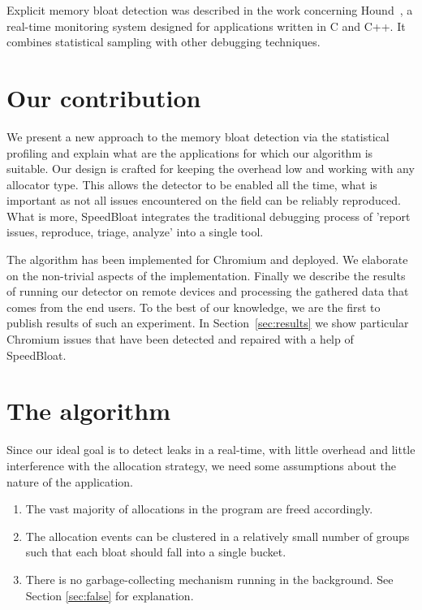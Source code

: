 \documentclass[preprint, numbers]{sigplanconf}
\begin{document}
Explicit memory bloat detection was described in the work concerning Hound~\cite{hound},
a real-time monitoring system designed for applications written in C and C++.
It combines statistical sampling with other debugging techniques.

\section{Our contribution}

We present a new approach to the memory bloat detection via the statistical profiling
and explain what are the applications for which our algorithm is suitable.
Our design is crafted for keeping the overhead low and working with any
allocator type.
This allows the detector to be enabled all the time, what is important as not all issues encountered on
the field can be reliably reproduced.
What is more, SpeedBloat integrates the traditional debugging process of 'report issues, reproduce, triage, analyze'
into a single tool.

The algorithm has been implemented for Chromium and deployed.
We elaborate on the non-trivial aspects of the implementation.
Finally we describe the results of running our detector on remote
devices and processing the gathered data that comes from the end users.
To the best of our knowledge, we are the first to publish results
of such an experiment.
In Section~\ref{sec:results} we show particular Chromium issues
that have been detected and repaired with a help of SpeedBloat.

\section{The algorithm}
\label{sec:algorithm}

Since our ideal goal is to detect leaks in a real-time, with little overhead and little interference with
the allocation strategy, we need some assumptions about the nature of the application.

\begin{enumerate}
\item The vast majority of allocations in the program are freed accordingly.
\item The allocation events can be clustered in a relatively small number of groups
	such that each bloat should fall into a single bucket.
\item There is no garbage-collecting mechanism running in the background.
	See Section \ref{sec:false} for explanation.
\end{enumerate}
\end{document}
